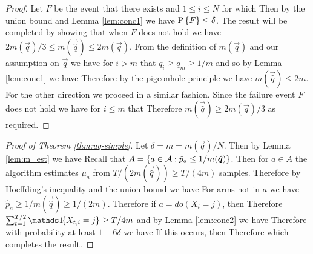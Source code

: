 \begin{proof}
Let $F$ be the event that there exists and $1 \leq i \leq N$ for which
Then by the union bound and Lemma \ref{lem:conc1} we have $\P{F} \leq \delta$. The result will be completed by showing that
when $F$ does not hold we have $2m(\vec{q})/3 \leq m(\vec{\hat q}) \leq 2m(\vec{q})$.
From the definition of $m(\vec{q})$ and our assumption on $\vec{q}$ we have for $i > m$ that $q_i \geq q_m \geq 1/m$ and so by Lemma \ref{lem:conc1} we have
Therefore by the pigeonhole principle we have $m(\vec{\hat q}) \leq 2m$.
For the other direction we proceed in a similar fashion. Since the failure event $F$ does not hold we have for $i \leq m$ that
Therefore $m(\vec{\hat q}) \geq 2m(\vec{q}) / 3$ as required. 
\end{proof}

\begin{proof}[Proof of Theorem \ref{thm:uq-simple}]
Let $\delta = m = m(\vec{q}) / N$. Then by Lemma \ref{lem:m_est} we have 
Recall that $A = \set{a \in \actions : \hat p_a \leq 1/m(\vec{\hat q})}$. Then
for $a \in A$ the algorithm estimates $\mu_a$ from $T/(2m(\vec{\hat q})) \geq T/(4m)$ samples.
Therefore by Hoeffding's inequality and the union bound we have
For arms not in $a$ we have $\hat p_a \geq 1/m(\vec{\hat q}) \geq 1/(2m)$.
Therefore if $a = do(X_i = j)$, then 
Therefore $\sum_{t=1}^{T/2} \ind{X_{t,i} = j} \geq T/4m$
and by Lemma \ref{lem:conc2} we have
Therefore with probability at least $1 - 6\delta$ we have
If this occurs, then 
Therefore
which completes the result.
\end{proof}

